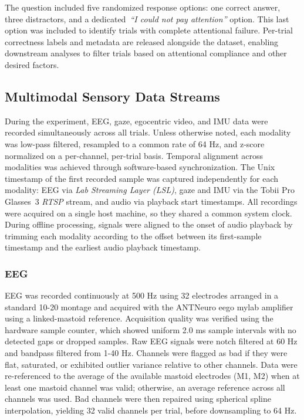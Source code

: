 \documentclass[journal]{IEEEtran}
\begin{document}
%
\noindent
The question included five randomized response options: one correct answer, three distractors, and a dedicated~\textit{``I could not pay attention''} option. This last option was included to identify trials with complete attentional failure. Per-trial correctness labels and metadata are released alongside the dataset, enabling downstream analyses to filter trials based on attentional compliance and other desired factors.

\subsection{Multimodal Sensory Data Streams} \label{sec:data_stream}

During the experiment, EEG, gaze, egocentric video, and IMU data were recorded simultaneously across all trials. Unless otherwise noted, each modality was low-pass filtered, resampled to a common rate of 64 Hz, and z-score normalized on a per-channel, per-trial basis.
%
Temporal alignment across modalities was achieved through software-based synchronization. The Unix timestamp of the first recorded sample was captured independently for each modality: EEG via \textit{Lab Streaming Layer (LSL)}, gaze and IMU via the Tobii Pro Glasses~3 \textit{RTSP} stream, and audio via playback start timestamps. All recordings were acquired on a single host machine, so they shared a common system clock. During offline processing, signals were aligned to the onset of audio playback by trimming each modality according to the offset between its first-sample timestamp and the earliest audio playback timestamp.

\subsubsection{EEG}

EEG was recorded continuously at 500 Hz using 32 electrodes arranged in a standard 10-20 montage and acquired with the ANTNeuro eego mylab amplifier using a linked-mastoid reference. Acquisition quality was verified using the hardware sample counter, which showed uniform 2.0 ms sample intervals with no detected gaps or dropped samples. Raw EEG signals were notch filtered at 60 Hz and bandpass filtered from 1-40 Hz. Channels were flagged as bad if they were flat, saturated, or exhibited outlier variance relative to other channels. Data were re-referenced to the average of the available mastoid electrodes (M1, M2) when at least one mastoid channel was valid; otherwise, an average reference across all channels was used. Bad channels were then repaired using spherical spline interpolation, yielding 32 valid channels per trial, before downsampling to 64 Hz.
\end{document}
